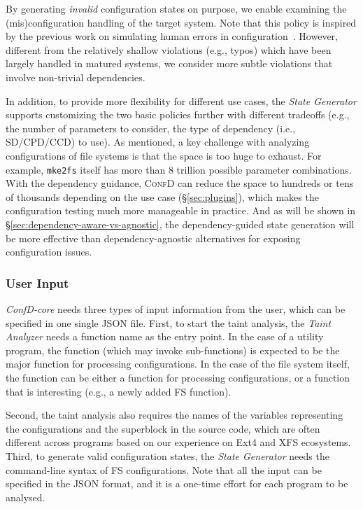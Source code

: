 By generating \textit{invalid} configuration states on purpose, we enable  examining the (mis)configuration handling of the target system. Note that this policy is inspired by the previous work on simulating human errors in configuration~\cite{Conferr-DSN08}. However, different from the relatively shallow violations (e.g., typos) which have been largely handled in matured systems, we consider more subtle violations that involve non-trivial dependencies.  

\smallskip
In addition, to provide more flexibility for different use cases, the \textit{State Generator} supports customizing the two basic policies further with different tradeoffs (e.g.,  the number of parameters  to consider, the type of dependency (i.e., SD/CPD/CCD) to use).  
As mentioned, a key challenge with analyzing configurations  of file systems is that the space is too huge to exhaust. For example, \texttt{mke2fs} itself has more than 8 trillion possible parameter combinations. With the dependency guidance, \textsc{ConfD} can reduce the space to hundreds or tens of thousands depending on the use case (\S\ref{sec:plugins}), which makes the configuration testing much more manageable in practice. And as will be shown in \S\ref{sec:dependency-aware-vs-agnostic}, the dependency-guided state generation will be more effective than dependency-agnostic alternatives for exposing configuration issues.


\subsubsection{{User Input}}
\label{sec:annotation}

\textit{ConfD-core} needs three types of input information 
from the user, which can be specified in one single JSON file.
First, to start the taint analysis, the \textit{Taint Analyzer} needs a function name as the entry point. In the case of a utility program, the function (which may invoke sub-functions) is expected to be the major function for processing configurations. In the case of the file system itself, the function can be either a function for processing configurations, or a function that is interesting (e.g., a newly added FS function). 

Second, the taint analysis also requires the names of the variables representing the configurations and the superblock in the source code, which are often different across programs based on our experience on Ext4 and XFS ecosystems. Third, to generate valid configuration states, the \textit{State Generator} needs the command-line syntax of FS configurations. Note that all the input  can be specified in the JSON format, and it is a one-time effort for each program to be analysed.



